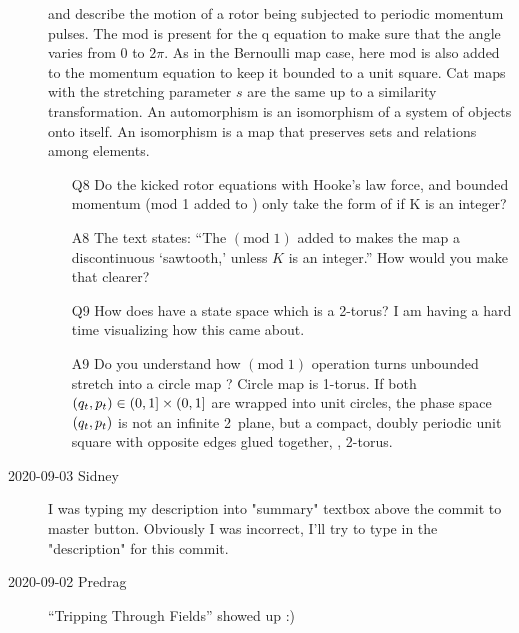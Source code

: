 \begin{description}
and  describe the motion of a rotor being subjected to
periodic momentum pulses. The mod is present for the q equation to make
sure that the angle varies from $0$ to $2\pi$. As in the Bernoulli map case,
here
mod is also added to the momentum equation to keep it bounded to a unit
square. Cat maps with the stretching parameter ${s}$ are the same up to a
similarity transformation. An automorphism is an isomorphism of a system
of objects onto itself. An isomorphism is a map that preserves sets and
relations among elements.

\begin{itemize}
	\item[Q8]
Do the kicked rotor equations with Hooke's law force, and bounded momentum (mod 1 added to ) only take the form of  if K is an integer?
	\item[A8]
The text states: ``The
$(\mbox{mod}\;1)$ added to  makes the map a
discontinuous `sawtooth,' unless $K$ is an integer.'' How would you make that clearer?
	\item[Q9]
How does  have a state space which is a 2-torus? I am having a hard time visualizing how this came about.
	\item[A9]
Do you understand how  $(\mbox{mod}\;1)$ operation turns unbounded stretch
 into a circle map ? Circle map is
1-torus. If both
\(
(q_{t},p_{t}) \in  (0,1]\times(0,1]
\)
are wrapped into unit circles, the phase space $(q_{t},p_{t})$
is not an infinite 2\dmn\ plane, but a compact, doubly periodic unit square with
opposite edges glued together, \ie, 2-torus.
\end{itemize}


\item[2020-09-03 Sidney]
I was typing my description into "summary" textbox above the commit to
master button. Obviously I was incorrect, I'll try to type in the
"description" for this commit.

\item[2020-09-02 Predrag]
``Tripping Through Fields'' showed up :)


\end{description}
